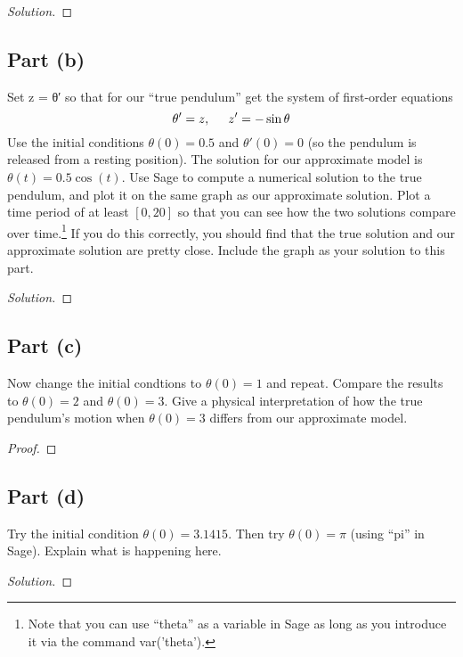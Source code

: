 \documentclass[letterpaper, 12pt]{amsart}
\theoremstyle{definition}  							%
\begin{document}
		\begin{proof}[Solution]
		\end{proof}

		\subsection*{Part (b)}
		Set z = θ′ so that for our “true pendulum” get the system of first-order equations $$\theta' = z, \hspace{5mm} z' = -\sin\theta$$
		Use the initial conditions $\theta(0) = 0.5$ and $\theta'(0) = 0$ (so the pendulum is released from a resting position). 
		The solution for our approximate model is $\theta(t) = 0.5 \cos(t)$. 
		Use Sage to compute a numerical solution to the true pendulum, and plot it on the same graph as our approximate solution. 
		Plot a time period of at least $[0, 20]$ so that you can see how the two solutions compare over time.\footnote{Note that you can use “theta” as a variable in Sage as long as you introduce it via the command var('theta').}
		If you do this correctly, you should find that the true solution and our approximate solution are pretty close. Include the graph as your solution to this part.

		\begin{proof}[Solution]
		\end{proof}

		\subsection*{Part (c)}
		Now change the initial condtions to $\theta(0) = 1$ and repeat. 
		Compare the results to $\theta(0) = 2$ and $\theta(0) = 3$. 
		Give a physical interpretation of how the true pendulum's motion when $\theta(0) = 3$ differs from our approximate model.

		\begin{proof}
			
		\end{proof}

		\subsection*{Part (d)}
		Try the initial condition $\theta(0) = 3.1415$. 
		Then try $\theta(0) = \pi$ (using ``pi'' in Sage). 
		Explain what is happening here.

		\begin{proof}[Solution]
		\end{proof}
\end{document}
